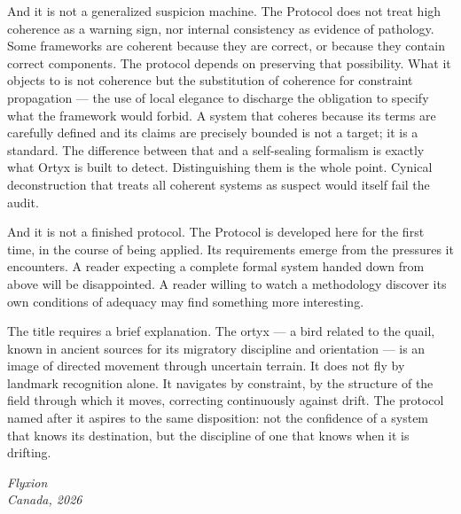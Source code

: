 And it is not a generalized suspicion machine. The \Ortyx{} Protocol
does not treat high coherence as a warning sign, nor internal
consistency as evidence of pathology. Some frameworks are coherent
because they are correct, or because they contain correct components.
The protocol depends on preserving that possibility. What it objects
to is not coherence but the substitution of coherence for constraint
propagation --- the use of local elegance to discharge the obligation
to specify what the framework would forbid. A system that coheres
because its terms are carefully defined and its claims are precisely
bounded is not a target; it is a standard. The difference between that
and a self-sealing formalism is exactly what Ortyx is built to detect.
Distinguishing them is the whole point. Cynical deconstruction that
treats all coherent systems as suspect would itself fail the audit.

And it is not a finished protocol. The \Ortyx{} Protocol is developed
here for the first time, in the course of being applied. Its
requirements emerge from the pressures it encounters. A reader
expecting a complete formal system handed down from above will be
disappointed. A reader willing to watch a methodology discover its
own conditions of adequacy may find something more interesting.

\medskip

The title requires a brief explanation. The ortyx --- a bird related
to the quail, known in ancient sources for its migratory discipline
and orientation --- is an image of directed movement through uncertain
terrain. It does not fly by landmark recognition alone. It navigates
by constraint, by the structure of the field through which it moves,
correcting continuously against drift. The protocol named after it
aspires to the same disposition: not the confidence of a system that
knows its destination, but the discipline of one that knows when it
is drifting.

\vspace{24pt}
\begin{flushright}
\textit{Flyxion}\\
\textit{Canada, 2026}
\end{flushright}
